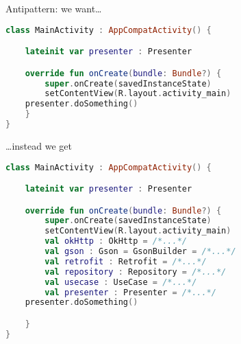 \documentclass[10pt]{beamer}
\begin{document}
\begin{frame}[fragile]
Antipattern: we want\ldots 
\begin{lstlisting}[language=Kotlin, basicstyle=\ttfamily]
class MainActivity : AppCompatActivity() {

    lateinit var presenter : Presenter

    override fun onCreate(bundle: Bundle?) {
        super.onCreate(savedInstanceState)
        setContentView(R.layout.activity_main)
	presenter.doSomething()
    }
}
\end{lstlisting} 
\end{frame}

\begin{frame}[fragile]
	\ldots instead  we get
\begin{lstlisting}[language=Kotlin, basicstyle=\ttfamily]
class MainActivity : AppCompatActivity() {

    lateinit var presenter : Presenter

    override fun onCreate(bundle: Bundle?) {
        super.onCreate(savedInstanceState)
        setContentView(R.layout.activity_main)
        val okHttp : OkHttp = /*...*/
        val gson : Gson = GsonBuilder = /*...*/
        val retrofit : Retrofit = /*...*/
        val repository : Repository = /*...*/
        val usecase : UseCase = /*...*/
        val presenter : Presenter = /*...*/
	presenter.doSomething()

    }
}
\end{lstlisting} 
\end{frame}
	
\end{document}
